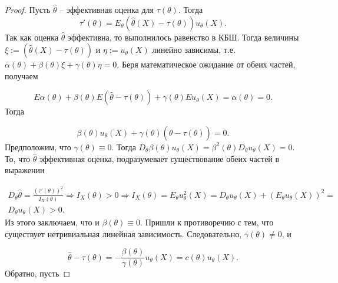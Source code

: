 \begin{proof}
Пусть $\displaystyle \hat{\theta }$ -- эффективная оценка для $\displaystyle \tau ( \theta )$. Тогда
\begin{equation*}
\tau '( \theta ) =E_{\theta }(\hat{\theta }( X) -\tau ( \theta )) u_{\theta }( X) .
\end{equation*}
Так как оценка $\displaystyle \hat{\theta }$ эффективна, то выполнилось равенство в КБШ. Тогда величины $\displaystyle \xi :=(\hat{\theta }( X) -\tau ( \theta ))$ и $\displaystyle \eta :=u_{\theta }( X)$ линейно зависимы, т.е. $\displaystyle \alpha ( \theta ) +\beta ( \theta ) \xi +\gamma ( \theta ) \eta =0$. Беря математическое ожидание от обеих частей, получаем


\begin{equation*}
E\alpha ( \theta ) +\beta ( \theta ) E(\hat{\theta } -\tau ( \theta )) +\gamma ( \theta ) Eu_{\theta }( X) =\alpha ( \theta ) =0.
\end{equation*}
Тогда


\begin{equation*}
\beta ( \theta ) u_{\theta }( X) +\gamma ( \theta )(\hat{\theta } -\tau ( \theta )) =0.
\end{equation*}
Предположим, что $\displaystyle \gamma ( \theta ) \equiv 0$. Тогда $\displaystyle D_{\theta } \beta ( \theta ) u_{\theta }( X) =\beta ^{2}( \theta ) D_{\theta } u_{\theta }( X) =0$. То, что $\displaystyle \hat{\theta }$ эффективная оценка, подразумевает существование обеих частей в выражении


\begin{gather*}
D_{\theta }\hat{\theta } =\frac{( \tau '( \theta ))^{2}}{I_{X}( \theta )} \Rightarrow I_{X}( \theta )  >0\Rightarrow I_{X}( \theta ) =E_{\theta } u_{\theta }^{2}( X) =D_{\theta } u_{\theta }( X) +( E_{\theta } u_{\theta }( X))^{2} =\\
D_{\theta } u_{\theta }( X)  >0.
\end{gather*}
Из этого заключаем, что и $\displaystyle \beta ( \theta ) \equiv 0$. Пришли к противоречию с тем, что существует нетривиальная линейная зависимость. Следовательно, $\displaystyle \gamma ( \theta ) \neq 0$, и


\begin{equation*}
\hat{\theta } -\tau ( \theta ) =-\frac{\beta ( \theta )}{\gamma ( \theta )} u_{\theta }( X) =c( \theta ) u_{\theta }( X) .
\end{equation*}
Обратно, пусть



\end{proof}
